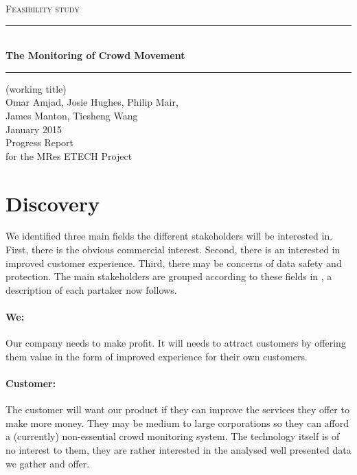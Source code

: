 \documentclass[12pt, oneside]{article}
\newcommand{\HRule}{\rule{\linewidth}{0.25mm}}
\begin{document}
\begin{titlepage}
\begin{center}

\Large{\textsc{Feasibility study}}

\HRule \\[0.35cm]
{\Huge \bfseries The Monitoring of Crowd Movement\\}
\HRule 

\small (working title)\\[0.5cm]

\large Omar Amjad, Josie Hughes, Philip Mair, \\ James Manton, Tiesheng Wang\\[1.0cm]
January 2015\\[1.0cm]

Progress Report\\
for the MRes ETECH Project\\

\vfill

\end{center}
\end{titlepage}

\section{Discovery}

We identified three main fields the different stakeholders will be interested in. First, there is the obvious commercial interest. Second, there is an interested in improved customer experience. Third, there may be concerns of data safety and protection. The main stakeholders are grouped according to these fields in , a description of each partaker now follows.

\paragraph{We:} Our company needs to make profit. It will needs to attract customers by offering them value in the form of improved experience for their own customers.

\paragraph{Customer:} The customer will want our product if they can improve the services they offer to make more money. They may be medium to large corporations so they can afford a (currently) non-essential crowd monitoring system. The technology itself is of no interest to them, they are rather interested in the analysed well presented data we gather and offer. 
\end{document}
